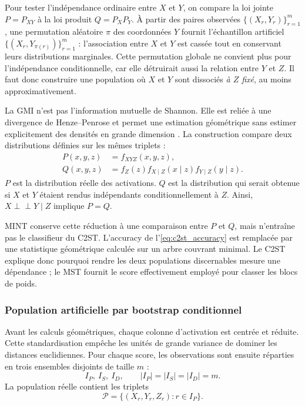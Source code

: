 Pour tester l'indépendance ordinaire entre $X$ et $Y$, on compare la loi jointe
$P=P_{XY}$ à la loi produit $Q=P_XP_Y$. À partir des paires observées
$\{(X_r,Y_r)\}_{r=1}^{m}$, une permutation aléatoire $\pi$ des coordonnées
$Y$ fournit l'échantillon artificiel
$\{(X_r,Y_{\pi(r)})\}_{r=1}^{m}$ : l'association entre $X$ et $Y$ est cassée
tout en conservant leurs distributions marginales. Cette permutation globale
ne convient plus pour l'indépendance conditionnelle, car elle détruirait aussi
la relation entre $Y$ et $Z$. Il faut donc construire une population où $X$ et
$Y$ sont dissociés \emph{à $Z$ fixé}, au moins approximativement.

La GMI n'est pas l'information mutuelle de Shannon. Elle est reliée à une
divergence de Henze--Penrose et permet une estimation géométrique sans estimer
explicitement des densités en grande dimension \cite{yasaei2019gmi}. La
construction compare deux distributions définies sur les mêmes triplets :
\begin{align}
    P(x,y,z)
        &=f_{XYZ}(x,y,z),\\
    Q(x,y,z)
        &=f_Z(z)f_{X\mid Z}(x\mid z)f_{Y\mid Z}(y\mid z).
    \label{eq:distributions_mint_pq}
\end{align}
$P$ est la distribution réelle des activations. $Q$ est la distribution qui
serait obtenue si $X$ et $Y$ étaient rendus indépendants conditionnellement à
$Z$. Ainsi, $X\perp\!\!\!\perp Y\mid Z$ implique $P=Q$.

MINT conserve cette réduction à une comparaison entre $P$ et $Q$, mais
n'entraîne pas le classifieur du C2ST. L'accuracy de
l'\autoref{eq:c2st_accuracy} est remplacée par une statistique géométrique
calculée sur un arbre couvrant minimal. Le C2ST explique donc pourquoi rendre
les deux populations discernables mesure une dépendance ; le MST fournit le
score effectivement employé pour classer les blocs de poids.

\subsubsection{Population artificielle par bootstrap conditionnel}

Avant les calculs géométriques, chaque colonne d'activation est centrée et
réduite. Cette standardisation empêche les unités de grande variance de dominer
les distances euclidiennes. Pour chaque score, les observations sont ensuite
réparties en trois ensembles disjoints de taille $m$ :
\begin{equation}
    I_P,\ I_S,\ I_D,
    \qquad |I_P|=|I_S|=|I_D|=m.
\end{equation}
La population réelle contient les triplets
\begin{equation}
    \mathcal{P}
    =\{(X_r,Y_r,Z_r):r\in I_P\}.
\end{equation}

